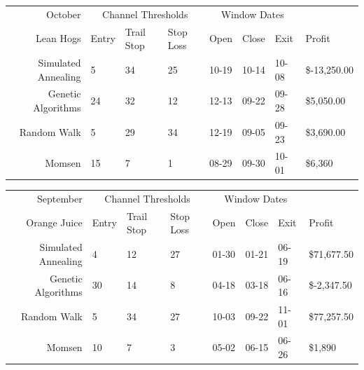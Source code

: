 \documentclass[12pt]{article}
\begin{document}
\begin{tabular}{|r|l|l|l|l|l|l|l|}
  \hline
  October & \multicolumn{3}{|c|}{Channel Thresholds} & \multicolumn{3}{|c|}{Window Dates} &  \\
  Lean Hogs & Entry & Trail Stop & Stop Loss & Open & Close & Exit & Profit\\ \hline
  Simulated Annealing & 5 & 34 & 25 & 10-19 & 10-14 & 10-08 & \$-13,250.00 \\ \hline
  Genetic Algorithms & 24 & 32 & 12 & 12-13 & 09-22 & 09-28 & \$5,050.00 \\ \hline
  Random Walk & 5 & 29 & 34 & 12-19 & 09-05 & 09-23 & \$3,690.00 \\ \hline
  Momsen & 15 & 7 & 1 & 08-29 & 09-30 & 10-01 & \$6,360 \\ \hline
\end{tabular}

\begin{tabular}{|r|l|l|l|l|l|l|l|}
  \hline
  September    & \multicolumn{3}{|c|}{Channel Thresholds} & \multicolumn{3}{|c|}{Window Dates} &  \\
  Orange Juice & Entry & Trail Stop & Stop Loss & Open & Close & Exit & Profit\\ \hline
  Simulated Annealing & 4 & 12 & 27 & 01-30 & 01-21 & 06-19 & \$71,677.50 \\ \hline
  Genetic Algorithms & 30 & 14 & 8 & 04-18 & 03-18 & 06-16 & \$-2,347.50 \\ \hline
  Random Walk & 5 & 34 & 27 & 10-03 & 09-22 & 11-01 & \$77,257.50 \\ \hline
  Momsen & 10 & 7 & 3 & 05-02 & 06-15 & 06-26 & \$1,890 \\ \hline
\end{tabular}



\nocite{*}
\end{document}
